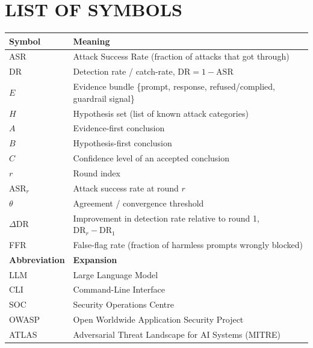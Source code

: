 \chapter*{LIST OF SYMBOLS}

\begin{center}
\renewcommand{\arraystretch}{1.4}
\begin{tabular}{>{\raggedright\arraybackslash}p{} p{}}
\hline
\textbf{Symbol} & \textbf{Meaning} \\
\hline
ASR & Attack Success Rate (fraction of attacks that got through) \\
DR & Detection rate / catch-rate, $\mathrm{DR} = 1 - \mathrm{ASR}$ \\
$E$ & Evidence bundle \{prompt, response, refused/complied, guardrail signal\} \\
$H$ & Hypothesis set (list of known attack categories) \\
$A$ & Evidence-first conclusion \\
$B$ & Hypothesis-first conclusion \\
$C$ & Confidence level of an accepted conclusion \\
$r$ & Round index \\
$\mathrm{ASR}_r$ & Attack success rate at round $r$ \\
$\theta$ & Agreement / convergence threshold \\
$\Delta\mathrm{DR}$ & Improvement in detection rate relative to round 1, $\mathrm{DR}_r - \mathrm{DR}_1$ \\
FFR & False-flag rate (fraction of harmless prompts wrongly blocked) \\
\hline
\textbf{Abbreviation} & \textbf{Expansion} \\
\hline
LLM & Large Language Model \\
CLI & Command-Line Interface \\
SOC & Security Operations Centre \\
OWASP & Open Worldwide Application Security Project \\
ATLAS & Adversarial Threat Landscape for AI Systems (MITRE) \\
\hline
\end{tabular}
\end{center}
